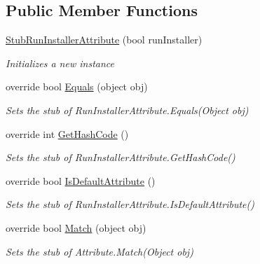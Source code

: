 \subsection*{Public Member Functions}
\begin{DoxyCompactItemize}
\item 
\hyperlink{class_system_1_1_component_model_1_1_fakes_1_1_stub_run_installer_attribute_a1936c9d3be05bd00b4c7bea9d7a22c26}{Stub\-Run\-Installer\-Attribute} (bool run\-Installer)
\begin{DoxyCompactList}\small\item\em Initializes a new instance\end{DoxyCompactList}\item 
override bool \hyperlink{class_system_1_1_component_model_1_1_fakes_1_1_stub_run_installer_attribute_a7c1a5dcbb03f6c12f0828321051b05bd}{Equals} (object obj)
\begin{DoxyCompactList}\small\item\em Sets the stub of Run\-Installer\-Attribute.\-Equals(\-Object obj)\end{DoxyCompactList}\item 
override int \hyperlink{class_system_1_1_component_model_1_1_fakes_1_1_stub_run_installer_attribute_ad7c4ba10cd322e656c2d37eaa98a9d00}{Get\-Hash\-Code} ()
\begin{DoxyCompactList}\small\item\em Sets the stub of Run\-Installer\-Attribute.\-Get\-Hash\-Code()\end{DoxyCompactList}\item 
override bool \hyperlink{class_system_1_1_component_model_1_1_fakes_1_1_stub_run_installer_attribute_a0a5c8bc9c0c1dbbe649c387f028e6ba0}{Is\-Default\-Attribute} ()
\begin{DoxyCompactList}\small\item\em Sets the stub of Run\-Installer\-Attribute.\-Is\-Default\-Attribute()\end{DoxyCompactList}\item 
override bool \hyperlink{class_system_1_1_component_model_1_1_fakes_1_1_stub_run_installer_attribute_a1e1ea2e86d0059816a491faac0fb93fa}{Match} (object obj)
\begin{DoxyCompactList}\small\item\em Sets the stub of Attribute.\-Match(\-Object obj)\end{DoxyCompactList}\end{DoxyCompactItemize}
